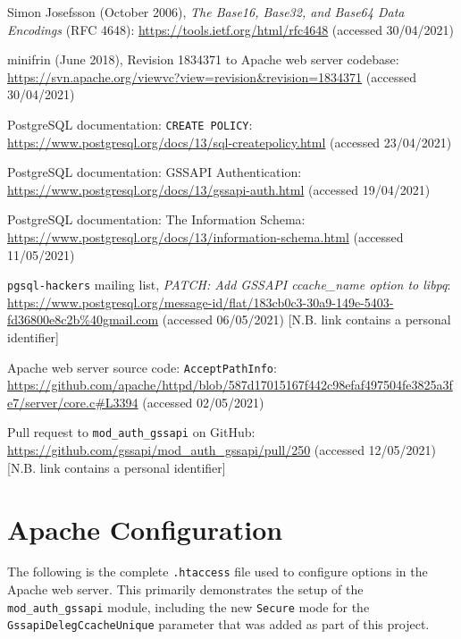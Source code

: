 \documentclass[12pt]{report}
\begin{document}
\begin{thebibliography}{99}
 Simon Josefsson (October 2006), \textit{The Base16, Base32, and Base64 Data Encodings} (RFC 4648): \url{https://tools.ietf.org/html/rfc4648} (accessed 30/04/2021)

 minifrin (June 2018), Revision 1834371 to Apache web server codebase: \url{https://svn.apache.org/viewvc?view=revision&revision=1834371} (accessed 30/04/2021)

 PostgreSQL documentation: \texttt{CREATE POLICY}: \url{https://www.postgresql.org/docs/13/sql-createpolicy.html} (accessed 23/04/2021)

 PostgreSQL documentation: GSSAPI Authentication: \url{https://www.postgresql.org/docs/13/gssapi-auth.html} (accessed 19/04/2021)

 PostgreSQL documentation: The Information Schema: \url{https://www.postgresql.org/docs/13/information-schema.html} (accessed 11/05/2021)

 \texttt{pgsql-hackers} mailing list, \textit{PATCH: Add GSSAPI ccache\_name option to libpq}: \url{https://www.postgresql.org/message-id/flat/183cb0c3-30a9-149e-5403-fd36800e8c2b%40gmail.com} (accessed 06/05/2021) [N.B. link contains a personal identifier]

 Apache web server source code: \texttt{AcceptPathInfo}: \url{https://github.com/apache/httpd/blob/587d17015167f442c98efaf497504fe3825a3fe7/server/core.c#L3394} (accessed 02/05/2021)

 Pull request to \verb+mod_auth_gssapi+ on GitHub: \url{https://github.com/gssapi/mod_auth_gssapi/pull/250} (accessed 12/05/2021) [N.B. link contains a personal identifier]


\end{thebibliography}

\appendix
\chapter{Apache Configuration}
\label{sec:appendix1}
The following is the complete \verb+.htaccess+ file used to configure options in the Apache web server. This primarily demonstrates the setup of the \verb+mod_auth_gssapi+ module, including the new \texttt{Secure} mode for the \texttt{GssapiDelegCcacheUnique} parameter that was added as part of this project.
\end{document}
